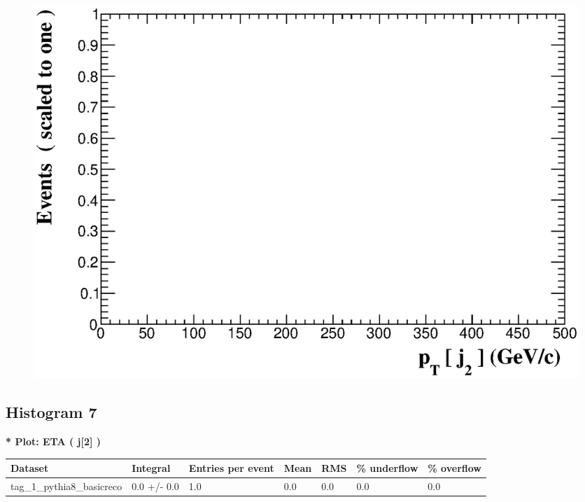 \documentclass[a4paper, 10pt]{article}
\begin{document}
\begin{figure}[H]
  \begin{center}
    \includegraphics[scale=0.45]{selection_5.eps}\\
\caption{   }
  \end{center}
\end{figure}
      \newpage
\subsection{ Histogram 7}

\textbf{* Plot: ETA ( j[2] ) }\\
   \begin{table}[H]
  \begin{center}
    \begin{tabular}{|m{23.0mm}|m{23.0mm}|m{18.0mm}|m{19.0mm}|m{19.0mm}|m{19.0mm}|m{19.0mm}|}
      \hline
      {\cellcolor{yellow}         Dataset}& {\cellcolor{yellow}         Integral}& {\cellcolor{yellow}         Entries per event}& {\cellcolor{yellow}         Mean}& {\cellcolor{yellow}         RMS}& {\cellcolor{yellow}         \% underflow}& {\cellcolor{yellow}         \% overflow}\\
      \hline
      {\cellcolor{white}         tag\_1\_pythia8\_basicreco}& {\cellcolor{white}         0.0 +/\-- 0.0}& {\cellcolor{white}         1.0}& {\cellcolor{white}         0.0}& {\cellcolor{white}         0.0}& {\cellcolor{green}         0.0}& {\cellcolor{green}         0.0}\\
\hline
    \end{tabular}
  \end{center}
\end{table}
\end{document}
